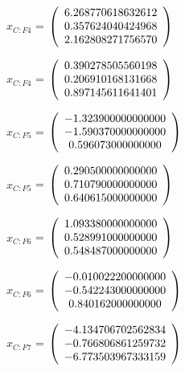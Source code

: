 \begin{description}
$x_{C:F4}$  = $\left( \begin{array} {ccc} 6.268770618632612 \\ 0.357624040424968 \\ 2.162808271756570
\end{array} \right)\\ \\$

$\hat{x}_{C:F4}$  = $\left( \begin{array} {ccc} 0.390278505560198 \\ 0.206910168131668 \\ 0.897145611641401
\end{array} \right)\\ \\$

$x_{C:F5}$  = $\left( \begin{array} {ccc} -1.323900000000000 \\ -1.590370000000000 \\ 0.596073000000000
\end{array} \right)\\ \\$

$\hat{x}_{C:F5}$  = $\left( \begin{array} {ccc} 0.290500000000000 \\ 0.710790000000000 \\ 0.640615000000000
\end{array} \right)\\ \\$

$x_{C:F6}$  = $\left( \begin{array} {ccc} 1.093380000000000 \\ 0.528991000000000 \\ 0.548487000000000
\end{array} \right)\\ \\$

$\hat{x}_{C:F6}$  = $\left( \begin{array} {ccc} -0.010022200000000 \\ -0.542243000000000 \\ 0.840162000000000
\end{array} \right)\\ \\$

$x_{C:F7}$  = $\left( \begin{array} {ccc} -4.134706702562834 \\ -0.766806861259732 \\ -6.773503967333159
\end{array} \right)\\ \\$


\end{description}
